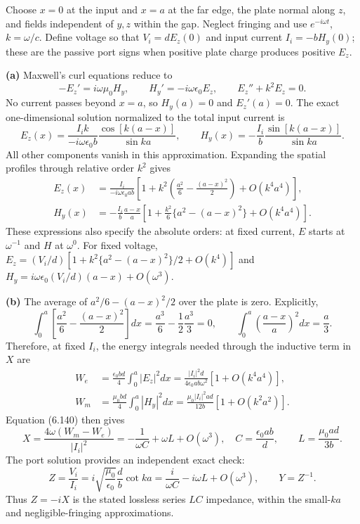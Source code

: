 Choose $x=0$ at the input and $x=a$ at the far edge, the plate normal along
$z$, and fields independent of $y,z$ within the gap. Neglect fringing and
use $e^{-i\omega t}$, $k=\omega/c$. Define voltage so that
$V_i=dE_z(0)$ and input current $I_i=-bH_y(0)$; these are the passive port
signs when positive plate charge produces positive $E_z$.

\textbf{(a)} Maxwell's curl equations reduce to
\[
-E_z'=i\omega\mu_0H_y,\qquad H_y'=-i\omega\epsilon_0E_z,
\qquad E_z''+k^2E_z=0.
\]
No current passes beyond $x=a$, so $H_y(a)=0$ and $E_z'(a)=0$.
The exact one-dimensional solution normalized to the total input current is
\[
E_z(x)=\frac{I_i k}{-i\omega\epsilon_0 b}
\frac{\cos[k(a-x)]}{\sin ka},\qquad
H_y(x)=-\frac{I_i}{b}\frac{\sin[k(a-x)]}{\sin ka}.
\]
All other components vanish in this approximation. Expanding the spatial
profiles through relative order $k^2$ gives
\begin{align*}
\boxed{E_z(x)}&=\boxed{\frac{I_i}{-i\omega\epsilon_0ab}
\left[1+k^2\left(\frac{a^2}{6}-\frac{(a-x)^2}{2}\right)+O(k^4a^4)\right]},\\
\boxed{H_y(x)}&=\boxed{-\frac{I_i}{b}\frac{a-x}{a}
\left[1+\frac{k^2}{6}\{a^2-(a-x)^2\}+O(k^4a^4)\right]}.
\end{align*}
These expressions also specify the absolute orders: at fixed current,
$E$ starts at $\omega^{-1}$ and $H$ at $\omega^0$. For fixed voltage,
$E_z=(V_i/d)[1+k^2\{a^2-(a-x)^2\}/2+O(k^4)]$ and
$H_y=i\omega\epsilon_0(V_i/d)(a-x)+O(\omega^3)$.

\textbf{(b)} The average of $a^2/6-(a-x)^2/2$ over the plate is zero.
Explicitly,
\[
\int_0^a\left[\frac{a^2}{6}-\frac{(a-x)^2}{2}\right]dx
=\frac{a^3}{6}-\frac12\frac{a^3}{3}=0,\qquad
\int_0^a\left(\frac{a-x}{a}\right)^2dx=\frac a3.
\]
Therefore, at fixed $I_i$, the energy integrals needed through the
inductive term in $X$ are
\begin{align*}
W_e&=\frac{\epsilon_0bd}{4}\int_0^a|E_z|^2dx
=\frac{|I_i|^2d}{4\epsilon_0ab\omega^2}[1+O(k^4a^4)],\\
W_m&=\frac{\mu_0bd}{4}\int_0^a|H_y|^2dx
=\frac{\mu_0|I_i|^2ad}{12b}[1+O(k^2a^2)].
\end{align*}
Equation (6.140) then gives
\[
X=\frac{4\omega(W_m-W_e)}{|I_i|^2}
=-\frac1{\omega C}+\omega L+O(\omega^3),\quad
\boxed{C=\frac{\epsilon_0ab}{d},\qquad L=\frac{\mu_0ad}{3b}}.
\]
The port solution provides an independent exact check:
\[
Z=\frac{V_i}{I_i}=i\sqrt{\frac{\mu_0}{\epsilon_0}}\frac db\cot ka
=\frac{i}{\omega C}-i\omega L+O(\omega^3),\qquad Y=Z^{-1}.
\]
Thus $Z=-iX$ is the stated lossless series $LC$ impedance, within the
small-$ka$ and negligible-fringing approximations.

